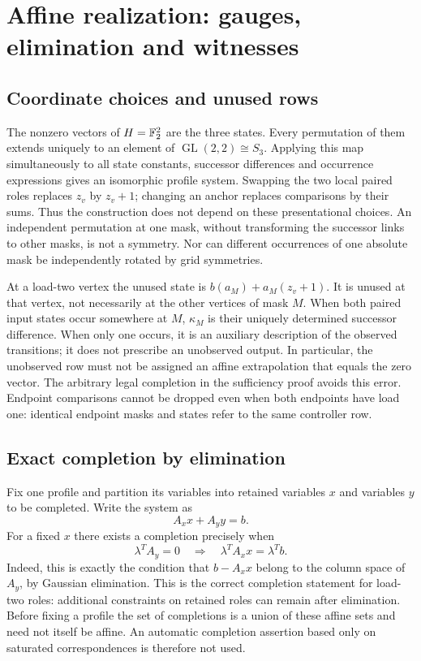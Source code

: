 \section{Affine realization: gauges, elimination and witnesses}
\label{app:realization-bookkeeping}

\subsection{Coordinate choices and unused rows}
The nonzero vectors of $H=\mathbb F_2^2$ are the three states. Every permutation of them
extends uniquely to an element of $\operatorname{GL}(2,2)\cong S_3$. Applying this
map simultaneously to all state constants, successor differences and occurrence
expressions gives an isomorphic profile system. Swapping the two local paired
roles replaces $z_v$ by $z_v+1$; changing an anchor replaces comparisons by their
sums. Thus the construction does not depend on these presentational choices.
An independent permutation at one mask, without transforming the successor
links to other masks, is not a symmetry. Nor can different occurrences of one
absolute mask be independently rotated by grid symmetries.

At a load-two vertex the unused state is $b(a_M)+a_M(z_v+1)$. It is unused at that
vertex, not necessarily at the other vertices of mask $M$. When both paired input
states occur somewhere at $M$, $\kappa_M$ is their uniquely determined successor
difference. When only one occurs, it is an auxiliary description of the observed
transitions; it does not prescribe an unobserved output. In particular, the
unobserved row must not be assigned an affine extrapolation that equals the zero
vector. The arbitrary legal completion in the sufficiency proof avoids this
error. Endpoint comparisons cannot be dropped even when both endpoints have
load one: identical endpoint masks and states refer to the same controller row.

\subsection{Exact completion by elimination}
\label{app:linear-completion}
Fix one profile and partition its variables into retained variables $x$ and
variables $y$ to be completed. Write the system as
\[
 A_xx+A_yy=b.
\]
For a fixed $x$ there exists a completion precisely when
\[
 \lambda^T A_y=0\quad\Longrightarrow\quad
 \lambda^T A_xx=\lambda^T b.
\]
Indeed, this is exactly the condition that $b-A_xx$ belong to the column space
of $A_y$, by Gaussian elimination. This is the correct completion statement for
load-two roles: additional constraints on retained roles can remain after
elimination. Before fixing a profile the set of completions is a union of these
affine sets and need not itself be affine. An automatic completion assertion
based only on saturated correspondences is therefore not used.


